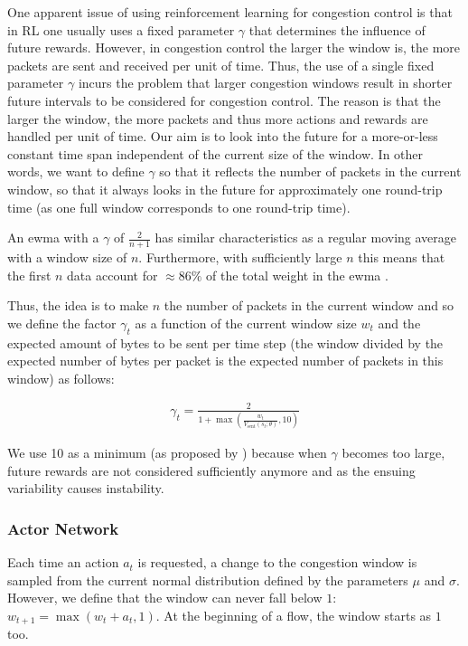 \documentclass[newfonts=false,format=sigconf,10pt,letterpaper]{acmart}
\begin{document}
One apparent issue of using reinforcement learning for congestion control is that in RL one usually uses a fixed parameter $\gamma$ that determines the influence of future rewards. However, in congestion control the larger the window is, the more packets are sent and received per unit of time. Thus, the use of a single fixed parameter $\gamma$ incurs the problem that larger congestion windows result in shorter future intervals to be considered for congestion control. The reason is that the larger the window, the more packets and thus more actions and rewards are handled per unit of time. Our aim is to look into the future for a more-or-less constant time span independent of the current size of the window. In other words, we want to define $\gamma$ so that it reflects the number of packets in the current window, so that it always looks in the future for approximately one round-trip time (as one full window corresponds to one round-trip time). 

An ewma with a $\gamma$ of $\frac{2}{n+1}$ has similar characteristics as a regular moving average with a window size of $n$. Furthermore, with sufficiently large $n$ this means that the first $n$ data account for $\approx 86\%$ of the total weight in the ewma \cite{nahmias_production_2009}.

Thus, the idea is to make $n$ the number of packets in the current window and so we define the factor $\gamma_t$ as a function of the current window size $w_t$ and the expected amount of bytes to be sent per time step (the window divided by the expected number of bytes per packet is the expected number of packets in this window) as follows:

\begin{align}
\gamma_t = \frac{2}{1+\max(\frac{w_t}{V_\text{sent}(s_t; \theta)},10)}
\end{align}

We use 10 as a minimum (as proposed by \cite{dong_pcc:_2015}) because when $\gamma$ becomes too large, future rewards are not considered sufficiently anymore and as the ensuing variability causes instability. 

\subsubsection{Actor Network}
\label{subsubsec:actor}

Each time an action $a_t$ is requested, a change to the congestion window is sampled from the current normal distribution defined by the parameters $\mu$ and $\sigma$. However, we define that the window can never fall below $1$: $w_{t+1} = \max(w_t + a_t, 1)$. At the beginning of a flow, the window starts as $1$ too.  
\end{document}
